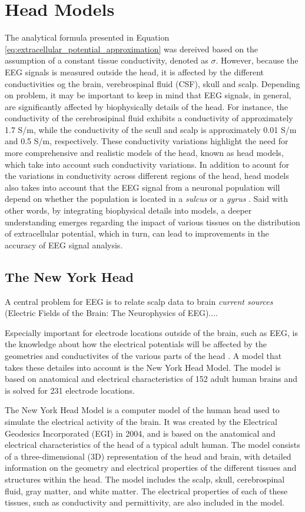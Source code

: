 \documentclass[a4paper, UKenglish, 11pt]{uiomaster}
\begin{document}
\section{Head Models}
The analytical formula presented in Equation \ref{eq:extracellular_potential_approximation} was dereived based on the assumption of a constant tissue conductivity, denoted as $\sigma$. However, because the EEG signals is measured outside the head, it is affected by the different conductivities og the brain, verebrospinal fluid (CSF), skull and scalp. Depending on problem, it may be important to keep in mind that EEG signals, in general, are significantly affected by biophysically details of the head. For instance, the conductivity of the cerebrosipinal fluid exhibits a conductivity of approximately 1.7 S/m, while the conductivity of the scull and scalp is approximately 0.01 S/m and 0.5 S/m, respectively. These conductivity variations highlight the need for more comprehensive and realistic models of the head, known as head models, which take into account such conductivity variations. In addition to acount for the variations in conductivity across different regions of the head, head models also takes into account that the EEG signal from a neuronal population will depend on whether the population is located in a \emph{sulcus} or a \emph{gyrus} \cite{naess2021biophysically}. Said with other words, by integrating biophysical details into models, a deeper understanding emerges regarding the impact of various tissues on the distribution of extracellular potential, which in turn, can lead to improvements in the accuracy of EEG signal analysis.


\subsection{The New York Head}
A central problem for EEG is to relate scalp data to brain \emph{current sources} (Electric Fields of the Brain: The Neurophysics of EEG)....

Especially important for electrode locations outside of the brain, such as EEG, is the knowledge about how the electrical potentials will be affected by the geometries and conductivites of the various parts of the head \cite{naess2021biophysically}. A model that takes these detailes into account is the New York Head Model. The model is based on anatomical and electrical characteristics of 152 adult human brains and is solved for 231 electrode locations.

The New York Head Model is a computer model of the human head used to simulate the electrical activity of the brain. It was created by the Electrical Geodesics Incorporated (EGI) in 2004, and is based on the anatomical and electrical characteristics of the head of a typical adult human. The model consists of a three-dimensional (3D) representation of the head and brain, with detailed information on the geometry and electrical properties of the different tissues and structures within the head. The model includes the scalp, skull, cerebrospinal fluid, gray matter, and white matter. The electrical properties of each of these tissues, such as conductivity and permittivity, are also included in the model.
\end{document}
